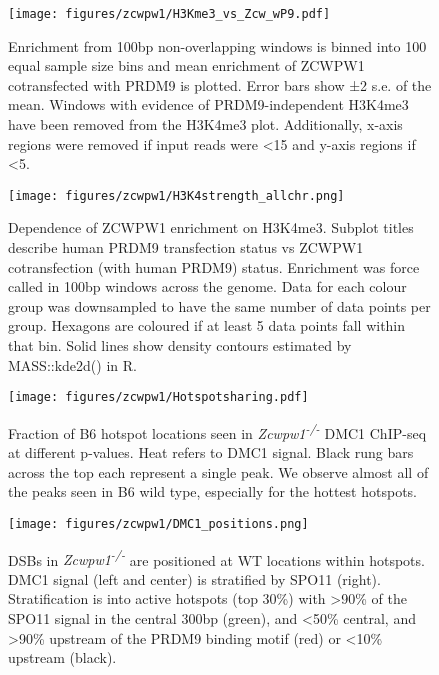 \begin{figure}[H]
	\centering
	\texttt{[image: figures/zcwpw1/H3Kme3\_vs\_Zcw\_wP9.pdf]}
	\caption[Histone Correlation from windows]{
		Enrichment from 100bp non-overlapping windows is binned into 100 equal sample size bins and mean enrichment of ZCWPW1 cotransfected with PRDM9 is plotted.
		Error bars show ±2 s.e. of the mean.
		Windows with evidence of PRDM9-independent H3K4me3 have been removed from the H3K4me3 plot.
		Additionally, x-axis regions were removed if input reads were <15 and y-axis regions if <5.
	}
	\label{fig:histone_corr2}
\end{figure}


\begin{figure}[H]
	\centering
	\texttt{[image: figures/zcwpw1/H3K4strength\_allchr.png]}
	\caption[Relative H3K4me3 Strength]{
		Dependence of ZCWPW1 enrichment on H3K4me3.
		Subplot titles describe human PRDM9 transfection status vs ZCWPW1 cotransfection (with human PRDM9) status.
		Enrichment was force called in 100bp windows across the genome.
		Data for each colour group was downsampled to have the same number of data points per group.
		Hexagons are coloured if at least 5 data points fall within that bin.
		Solid lines show density contours estimated by MASS::kde2d() in R.
	}
	\label{fig:H3K4strength_denisty}
\end{figure}


\begin{figure}[H]
	\centering
	\texttt{[image: figures/zcwpw1/Hotspotsharing.pdf]}
	\caption[Hotspot Sharing]{
		Fraction of B6 hotspot locations seen in \textit{Zcwpw1\textsuperscript{-/-}} DMC1 ChIP-seq at different p-values.
		Heat refers to DMC1 signal.
		Black rung bars across the top each represent a single peak.
		We observe almost all of the peaks seen in B6 wild type, especially for the hottest hotspots.
	}
	\label{fig:hotspotsharing}
\end{figure}


\begin{figure}[H]
	\centering
	\texttt{[image: figures/zcwpw1/DMC1\_positions.png]}
	\caption[DMC1 positions]{
		DSBs in \textit{Zcwpw1\textsuperscript{-/-}} are positioned at WT locations within hotspots.
		DMC1 signal (left and center) is stratified by SPO11 (right).
		Stratification is into active hotspots (top 30\%) with >90\% of the SPO11 signal in the central 300bp (green), and <50\% central, and >90\% upstream of the PRDM9 binding motif (red) or <10\% upstream (black).
	}
	\label{fig:DMC1_positions}
\end{figure}



